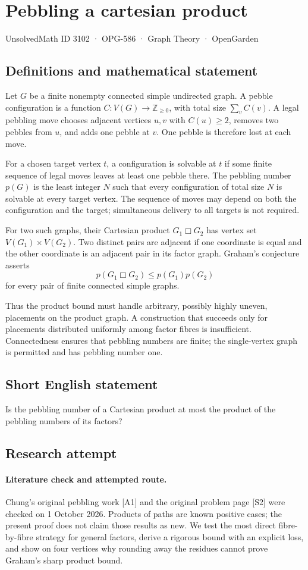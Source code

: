 \documentclass[11pt,a4paper]{article}
\begin{document}
\section*{Pebbling a cartesian product}\label{3102}
{\small UnsolvedMath ID 3102 · OPG-586 · Graph Theory · OpenGarden}
\subsection{Definitions and mathematical statement}
Let $G$ be a finite nonempty connected simple undirected graph.
A pebble configuration is a function $C:V(G)\to\mathbb Z_{\ge0}$,
with total size $\sum_v C(v)$. A legal pebbling move chooses adjacent
vertices $u,v$ with $C(u)\ge2$, removes two pebbles from $u$, and adds
one pebble at $v$. One pebble is therefore lost at each move.

For a chosen target vertex $t$, a configuration is solvable at $t$ if
some finite sequence of legal moves leaves at least one pebble there.
The pebbling number $p(G)$ is the least integer $N$ such that every
configuration of total size $N$ is solvable at every target vertex.
The sequence of moves may depend on both the configuration and the
target; simultaneous delivery to all targets is not required.

For two such graphs, their Cartesian product $G_1\mathbin\Box G_2$ has
vertex set $V(G_1)\times V(G_2)$. Two distinct pairs are adjacent if
one coordinate is equal and the other coordinate is an adjacent pair
in its factor graph.
Graham's conjecture asserts
\[
 p(G_1\mathbin\Box G_2)\le p(G_1)p(G_2)
\]
for every pair of finite connected simple graphs.

Thus the product bound must handle arbitrary, possibly highly uneven,
placements on the product graph. A construction that succeeds only for
placements distributed uniformly among factor fibres is insufficient.
Connectedness ensures that pebbling numbers are finite; the single-vertex
graph is permitted and has pebbling number one.
\subsection{Short English statement}
Is the pebbling number of a Cartesian product at most the product of the pebbling numbers of its factors?
\subsection{Research attempt}
\paragraph{Literature check and attempted route.}
Chung's original pebbling work [A1] and the original problem page [S2] were
checked on 1 October 2026. Products of paths are known positive cases; the
present proof does not claim those results as new. We test the most direct
fibre-by-fibre strategy for general factors, derive a rigorous bound with
an explicit loss, and show on four vertices why rounding away the residues
cannot prove Graham's sharp product bound.
\end{document}
